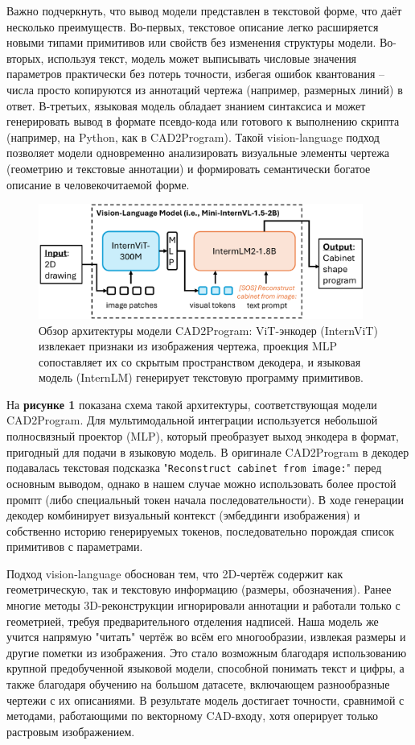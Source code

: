 \documentclass{article}
\begin{document}
Важно подчеркнуть, что вывод модели представлен в текстовой форме, что даёт несколько преимуществ. Во-первых, текстовое описание легко расширяется новыми типами примитивов или свойств без изменения структуры модели. Во-вторых, используя текст, модель может выписывать числовые значения параметров практически без потерь точности, избегая ошибок квантования – числа просто копируются из аннотаций чертежа (например, размерных линий) в ответ. В-третьих, языковая модель обладает знанием синтаксиса и может генерировать вывод в формате псевдо-кода или готового к выполнению скрипта (например, на Python, как в CAD2Program). Такой vision-language подход позволяет модели одновременно анализировать визуальные элементы чертежа (геометрию и текстовые аннотации) и формировать семантически богатое описание в человекочитаемой форме.

\begin{figure}[h!]
\centering
\includegraphics[width=0.95\textwidth]{internvl.png}
\caption{Обзор архитектуры модели CAD2Program: ViT-энкодер (InternViT) извлекает признаки из изображения чертежа, проекция MLP сопоставляет их со скрытым пространством декодера, и языковая модель (InternLM) генерирует текстовую программу примитивов.}
\end{figure}

На \textbf{рисунке 1} показана схема такой архитектуры, соответствующая модели CAD2Program. Для мультимодальной интеграции используется небольшой полносвязный проектор (MLP), который преобразует выход энкодера в формат, пригодный для подачи в языковую модель. В оригинале CAD2Program в декодер подавалась текстовая подсказка "\texttt{Reconstruct cabinet from image:}" перед основным выводом, однако в нашем случае можно использовать более простой промпт (либо специальный токен начала последовательности). В ходе генерации декодер комбинирует визуальный контекст (эмбеддинги изображения) и собственно историю генерируемых токенов, последовательно порождая список примитивов с параметрами.

Подход vision-language обоснован тем, что 2D-чертёж содержит как геометрическую, так и текстовую информацию (размеры, обозначения). Ранее многие методы 3D-реконструкции игнорировали аннотации и работали только с геометрией, требуя предварительного отделения надписей. Наша модель же учится напрямую "читать" чертёж во всём его многообразии, извлекая размеры и другие пометки из изображения. Это стало возможным благодаря использованию крупной предобученной языковой модели, способной понимать текст и цифры, а также благодаря обучению на большом датасете, включающем разнообразные чертежи с их описаниями. В результате модель достигает точности, сравнимой с методами, работающими по векторному CAD-входу, хотя оперирует только растровым изображением.
\end{document}
